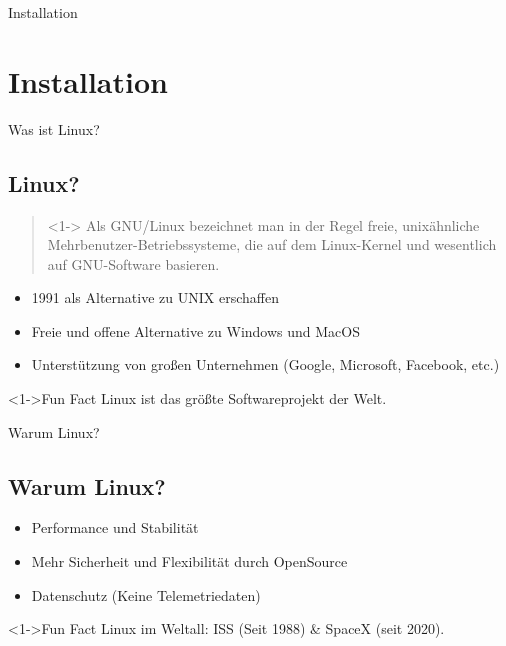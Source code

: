 
\begin{frame}{Installation}
    \section{Installation}\label{sec:installation}
\end{frame}

\begin{frame}{Was ist Linux?}
    \subsection{Linux?}\label{subsec:linux?}

    \begin{quote}<1->
        Als GNU/Linux bezeichnet man in der Regel freie, unixähnliche Mehrbenutzer-Betriebssysteme, die auf dem Linux-Kernel und wesentlich auf GNU-Software basieren.
    \end{quote}

    \begin{itemize}
        \item<2-> 1991 als Alternative zu UNIX erschaffen
        \item<3-> Freie und offene Alternative zu Windows und MacOS
        \item<4-> Unterstützung von großen Unternehmen (Google, Microsoft, Facebook, etc.)
    \end{itemize}
    \begin{exampleblock}<1->{Fun Fact}
        Linux ist das größte Softwareprojekt der Welt.
    \end{exampleblock}

\end{frame}

\begin{frame}{Warum Linux?}
    \subsection{Warum Linux?}\label{subsec:warum-linux?}

    \begin{itemize}
        \item Performance und Stabilität
        \item Mehr Sicherheit und Flexibilität durch OpenSource
        \item Datenschutz (Keine Telemetriedaten)
    \end{itemize}

    \begin{exampleblock}<1->{Fun Fact}
        Linux im Weltall: ISS (Seit 1988) \& SpaceX (seit 2020).
    \end{exampleblock}

\end{frame}

